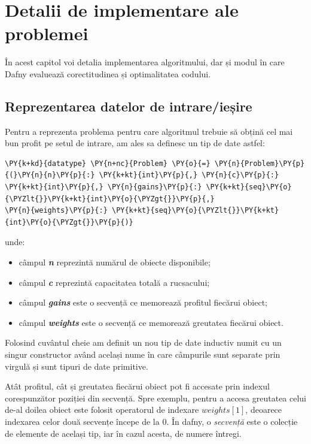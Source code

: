 \lstset{style=mylststyle}
\begin{sloppypar}


\chapter{Detalii de implementare ale problemei}
În acest capitol voi detalia implementarea algoritmului, dar și modul în care Dafny evaluează corectitudinea și optimalitatea codului. 

\section{Reprezentarea datelor de intrare/ieșire}

Pentru a reprezenta problema pentru care algoritmul trebuie să obțină cel mai bun profit pe setul de intrare, am ales sa definesc un tip de date  astfel:

\begin{Verbatim}[commandchars=\\\{\}]
\PY{k+kd}{datatype} \PY{n+nc}{Problem} \PY{o}{=} \PY{n}{Problem}\PY{p}{(}\PY{n}{n}\PY{p}{:} \PY{k+kt}{int}\PY{p}{,} \PY{n}{c}\PY{p}{:} \PY{k+kt}{int}\PY{p}{,} \PY{n}{gains}\PY{p}{:} \PY{k+kt}{seq}\PY{o}{\PYZlt{}}\PY{k+kt}{int}\PY{o}{\PYZgt{}}\PY{p}{,} 
\PY{n}{weights}\PY{p}{:} \PY{k+kt}{seq}\PY{o}{\PYZlt{}}\PY{k+kt}{int}\PY{o}{\PYZgt{}}\PY{p}{)} 
\end{Verbatim}
unde:
\begin{itemize}
    \item câmpul \textit{\textbf{\textcolor{coleight}{n}}} reprezintă numărul de obiecte disponibile;
    \item câmpul \textit{\textbf{\textcolor{coleight}{c}}} reprezintă capacitatea totală a rucsacului;
    \item câmpul \textit{\textbf{\textcolor{coleight}{gains}}} este o secvență ce memorează profitul fiecărui obiect;
    \item câmpul \textit{\textbf{\textcolor{coleight}{weights}}} este o secvență ce memorează greutatea fiecărui obiect.
\end{itemize} \par
Folosind cuvântul cheie  am definit un nou tip de date inductiv numit  cu un singur constructor având același nume în care câmpurile sunt separate prin virgulă și sunt tipuri de date primitive.
\par
Atât profitul, cât și greutatea fiecărui obiect pot fi accesate prin indexul corespunzător poziției din secvență. Spre exemplu, pentru a accesa greutatea celui de-al doilea obiect este folosit operatorul de indexare $weights[1]$, deoarece indexarea celor două secvențe începe de la 0. În dafny, o \textit{secvență} este o colecție de elemente de același tip, iar în cazul acesta, de numere întregi. \\ \par


\end{sloppypar}
